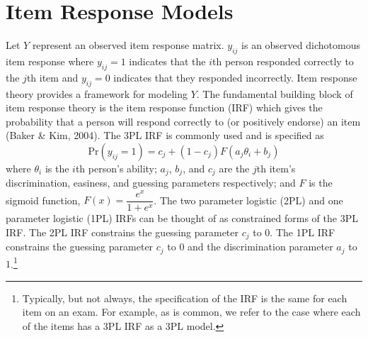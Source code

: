 \documentclass[
  english,
  man,floatsintext]{apa7}
\begin{document}
\hypertarget{item-response-models}{%
\section{Item Response Models}\label{item-response-models}}

Let \(Y\) represent an observed item response matrix. \(y_{ij}\) is an observed dichotomous item response where \(y_{ij} = 1\) indicates that the \(i\)th person responded correctly to the \(j\)th item and \(y_{ij} = 0\) indicates that they responded incorrectly. Item response theory provides a framework for modeling \(Y\). The fundamental building block of item response theory is the item response function (IRF) which gives the probability that a person will respond correctly to (or positively endorse) an item (Baker \& Kim, 2004). The 3PL IRF is commonly used and is specified as
\begin{equation}
    \text{Pr}(y_{ij} = 1) = c_j + (1 - c_j) F(a_j \theta_i + b_j)
\end{equation}
where \(\theta_i\) is the \(i\)th person's ability; \(a_j\), \(b_j\), and \(c_j\) are the \(j\)th item's discrimination, easiness, and guessing parameters respectively; and \(F\) is the sigmoid function, \(F(x) = \dfrac{e^x}{1 + e^x}\). The two parameter logistic (2PL) and one parameter logistic (1PL) IRFs can be thought of as constrained forms of the 3PL IRF. The 2PL IRF constrains the guessing parameter \(c_j\) to \(0\). The 1PL IRF constrains the guessing parameter \(c_j\) to \(0\) and the discrimination parameter \(a_j\) to \(1\).\footnote{Typically, but not always, the specification of the IRF is the same for each item on an exam. For example, as is common, we refer to the case where each of the items has a 3PL IRF as a 3PL model.}
\end{document}
